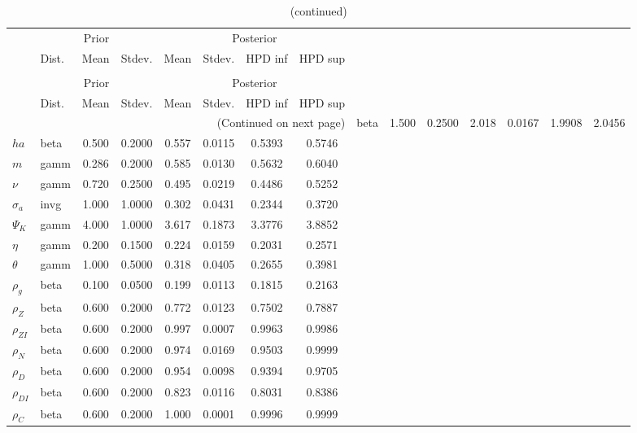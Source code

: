  
\begin{center}
\begin{longtable}{llcccccc} 
\caption{Results from Metropolis-Hastings (parameters)}
 \label{Table:MHPosterior:1}\\
\toprule 
  & \multicolumn{3}{c}{Prior}  &  \multicolumn{4}{c}{Posterior} \\
  \cmidrule(r{.75em}){2-4} \cmidrule(r{.75em}){5-8}
  & Dist. & Mean  & Stdev. & Mean & Stdev. & HPD inf & HPD sup\\
\midrule \endfirsthead 
\caption{(continued)}\\\toprule 
  & \multicolumn{3}{c}{Prior}  &  \multicolumn{4}{c}{Posterior} \\
  \cmidrule(r{.75em}){2-4} \cmidrule(r{.75em}){5-8}
  & Dist. & Mean  & Stdev. & Mean & Stdev. & HPD inf & HPD sup\\
\midrule \endhead 
\bottomrule \multicolumn{8}{r}{(Continued on next page)} \endfoot 
\bottomrule \endlastfoot 
${\gamma}$ & beta &   1.500 & 0.2500 &   2.018& 0.0167 &  1.9908 &  2.0456 \\ 
${ha}$ & beta &   0.500 & 0.2000 &   0.557& 0.0115 &  0.5393 &  0.5746 \\ 
${m}$ & gamm &   0.286 & 0.2000 &   0.585& 0.0130 &  0.5632 &  0.6040 \\ 
$\nu$ & gamm &   0.720 & 0.2500 &   0.495& 0.0219 &  0.4486 &  0.5252 \\ 
${\sigma_a}$ & invg &   1.000 & 1.0000 &   0.302& 0.0431 &  0.2344 &  0.3720 \\ 
${\Psi_K}$ & gamm &   4.000 & 1.0000 &   3.617& 0.1873 &  3.3776 &  3.8852 \\ 
${\eta}$ & gamm &   0.200 & 0.1500 &   0.224& 0.0159 &  0.2031 &  0.2571 \\ 
${\theta}$ & gamm &   1.000 & 0.5000 &   0.318& 0.0405 &  0.2655 &  0.3981 \\ 
${\rho_g}$ & beta &   0.100 & 0.0500 &   0.199& 0.0113 &  0.1815 &  0.2163 \\ 
${\rho_Z}$ & beta &   0.600 & 0.2000 &   0.772& 0.0123 &  0.7502 &  0.7887 \\ 
${\rho_{ZI}}$ & beta &   0.600 & 0.2000 &   0.997& 0.0007 &  0.9963 &  0.9986 \\ 
${\rho_N}$ & beta &   0.600 & 0.2000 &   0.974& 0.0169 &  0.9503 &  0.9999 \\ 
${\rho_D}$ & beta &   0.600 & 0.2000 &   0.954& 0.0098 &  0.9394 &  0.9705 \\ 
${\rho_{DI}}$ & beta &   0.600 & 0.2000 &   0.823& 0.0116 &  0.8031 &  0.8386 \\ 
${\rho_C}$ & beta &   0.600 & 0.2000 &   1.000& 0.0001 &  0.9996 &  0.9999 \\ 
\end{longtable}
 \end{center}
